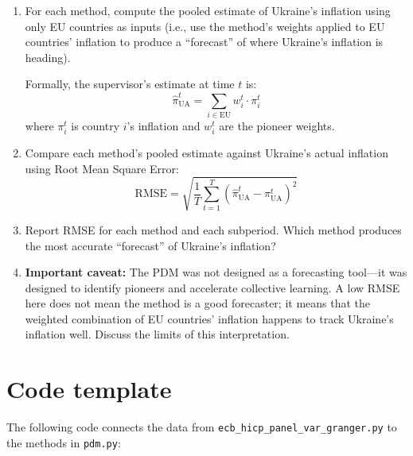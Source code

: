 \documentclass[11pt,a4paper]{article}
\begin{document}
\begin{enumerate}[label=(\alph*)]
    \item For each method, compute the pooled estimate of Ukraine's inflation using only EU countries as inputs (i.e., use the method's weights applied to EU countries' inflation to produce a ``forecast'' of where Ukraine's inflation is heading).

    Formally, the supervisor's estimate at time $t$ is:
    \[
    \hat{\pi}_{\text{UA}}^t = \sum_{i \in \text{EU}} w_i^t \cdot \pi_i^t
    \]
    where $\pi_i^t$ is country $i$'s inflation and $w_i^t$ are the pioneer weights.

    \item Compare each method's pooled estimate against Ukraine's actual inflation using Root Mean Square Error:
    \[
    \text{RMSE} = \sqrt{\frac{1}{T}\sum_{t=1}^T \left(\hat{\pi}_{\text{UA}}^t - \pi_{\text{UA}}^t\right)^2}
    \]

    \item Report RMSE for each method and each subperiod. Which method produces the most accurate ``forecast'' of Ukraine's inflation?

    \item \textbf{Important caveat:} The PDM was not designed as a forecasting tool---it was designed to identify pioneers and accelerate collective learning. A low RMSE here does not mean the method is a good forecaster; it means that the weighted combination of EU countries' inflation happens to track Ukraine's inflation well. Discuss the limits of this interpretation.
\end{enumerate}

\section*{Code template}

The following code connects the data from \texttt{ecb\_hicp\_panel\_var\_granger.py} to the methods in \texttt{pdm.py}:
\end{document}
